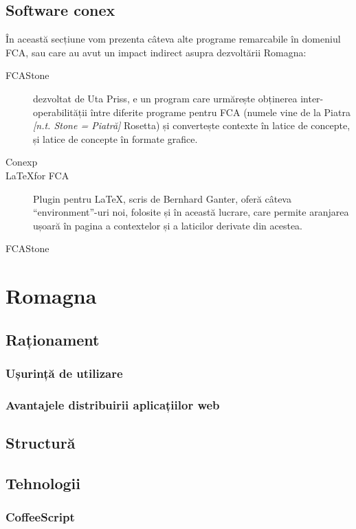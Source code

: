 \documentclass[12pt, a4paper, twoside, romanian]{teza-upb}
\begin{document}
  \section{Software conex}

    În această secțiune vom prezenta câteva alte programe remarcabile în domeniul FCA, sau care au avut un impact indirect asupra dezvoltării Romagna:
    \begin{description}
      \item[FCAStone] dezvoltat de Uta Priss, e un program care urmărește obținerea inter-operabilității între diferite programe pentru FCA (numele vine de la Piatra \textit{[n.t. Stone = Piatră]} Rosetta) și convertește contexte în latice de concepte, și latice de concepte în formate grafice.
      \item[Conexp]
      \item[\LaTeX for FCA] \cite{LatexForFCA:homepage} Plugin pentru \LaTeX, scris de Bernhard Ganter, oferă câteva ``environment''-uri noi, folosite și în această lucrare, care permite aranjarea ușoară în pagina a contextelor și a laticilor derivate din acestea.
      \item[FCAStone]
    \end{description}

\chapter{Romagna}
  \section{Raționament}
  \label{sec:rationament}

    \subsection{Ușurință de utilizare}

    \subsection{Avantajele distribuirii aplicațiilor web}
  \section{Structură}
  \section{Tehnologii}
    \subsection{CoffeeScript}
\end{document}

